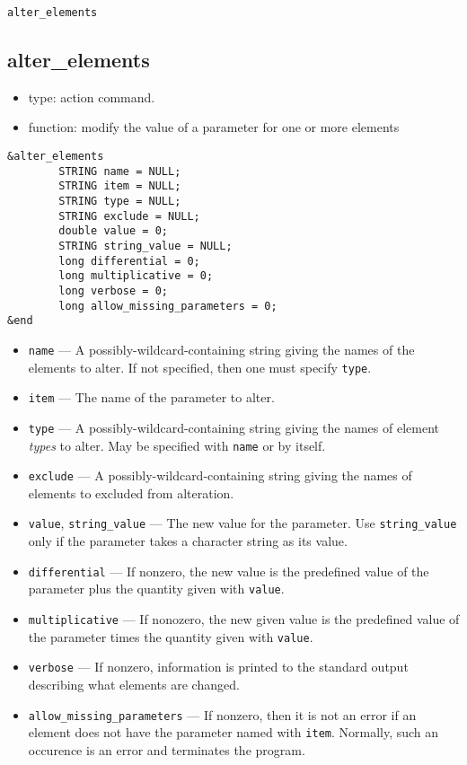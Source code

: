 \documentclass[11pt]{article}
\begin{document}
\begin{latexonly}
\newpage
\begin{center}{\Large\verb|alter_elements|}\end{center}
\end{latexonly}
\subsection{alter\_elements}

\begin{itemize}
\item type: action command.
\item function: modify the value of a parameter for one or more elements
\end{itemize}

\begin{verbatim}
&alter_elements
        STRING name = NULL;
        STRING item = NULL;
        STRING type = NULL;
        STRING exclude = NULL;
        double value = 0;
        STRING string_value = NULL;
        long differential = 0;
        long multiplicative = 0;
        long verbose = 0;
        long allow_missing_parameters = 0;
&end
\end{verbatim}

\begin{itemize}
\item \verb|name| --- A possibly-wildcard-containing string giving the names of the
        elements to alter.  If not specified, then one must specify \verb|type|.
\item \verb|item| --- The name of the parameter to alter.
\item \verb|type| --- A possibly-wildcard-containing string giving the names of element
        {\em types} to alter.  May be specified with \verb|name| or by itself.
\item \verb|exclude| --- A possibly-wildcard-containing string giving the names of elements
        to excluded from alteration.
\item \verb|value|, \verb|string_value| --- The new value for the parameter.  Use
      \verb|string_value| only if the parameter takes a character string as its value.
\item \verb|differential| --- If nonzero, the new value is 
        the predefined value of the parameter plus the quantity given with \verb|value|.
\item \verb|multiplicative| --- If nonozero, the new given value is the predefined
        value of the parameter times the quantity given with \verb|value|.
\item \verb|verbose| --- If nonzero, information is printed to the standard output describing
        what elements are changed.
\item \verb|allow_missing_parameters| --- If nonzero, then it is not an error if an
        element does not have the parameter named with \verb|item|.  Normally, such
        an occurence is an error and terminates the program.
\end{itemize}
\end{document}
